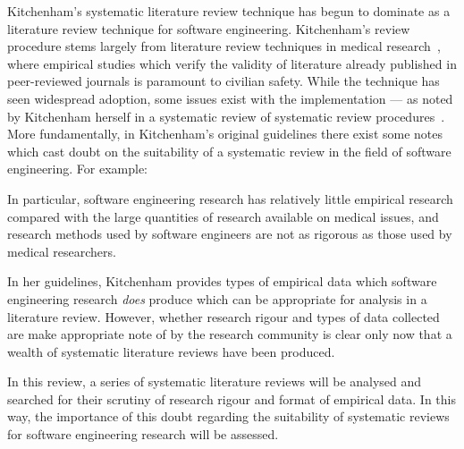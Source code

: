 Kitchenham's systematic literature review technique has begun to dominate as a literature review technique for software engineering. Kitchenham's review procedure stems largely from literature review techniques in medical research~\citep{Kitchenham2004, khan2001undertaking}, where empirical studies which verify the validity of literature already published in peer-reviewed journals is paramount to civilian safety. While the technique has seen widespread adoption, some issues exist with the implementation --- as noted by Kitchenham herself in a systematic review of systematic review procedures~\citep{Kitchenham2013}. More fundamentally, in Kitchenham's original guidelines there exist some notes which cast doubt on the suitability of a systematic review in the field of software engineering. For example:
\begin{displayquote}
    In particular, software engineering research has relatively little empirical research compared with the large quantities of research available on medical issues, and research methods used by software engineers are not as rigorous as those used by medical researchers.
\end{displayquote}
In her guidelines, Kitchenham provides types of empirical data which software engineering research \emph{does} produce which can be appropriate for analysis in a literature review. However, whether research rigour and types of data collected are make appropriate note of by the research community is clear only now that a wealth of systematic literature reviews have been produced.\par

In this review, a series of systematic literature reviews will be analysed and searched for their scrutiny of research rigour and format of empirical data. In this way, the importance of this doubt regarding the suitability of systematic reviews for software engineering research will be assessed.








